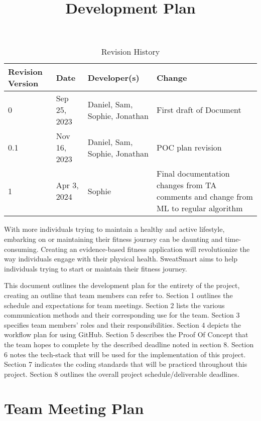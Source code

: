 \documentclass{article}
\title{Development Plan\\\progname}
\author{\authname}  %
\date{}
\begin{document}
	\maketitle
	\begin{table}[hp]
		\centering
		\caption{Revision History} \label{TblRevisionHistory}
		\begin{tabularx}{\textwidth}{lllX}
			\toprule
			\textbf{Revision Version} & \textbf{Date} & \textbf{Developer(s)} & \textbf{Change}\\
			\midrule
			0 & Sep 25, 2023 & Daniel, Sam, Sophie, Jonathan & First draft of Document\\
            0.1 & Nov 16, 2023 & Daniel, Sam, Sophie, Jonathan & POC plan revision\\
            1 & Apr 3, 2024 & Sophie & Final documentation changes from TA comments and change from ML to regular algorithm\\ 
            \bottomrule
		\end{tabularx}
	\end{table}
	\vspace{0.5cm}
	\maketitle

	With more individuals trying to maintain a healthy and active lifestyle, embarking on or maintaining their fitness journey can be daunting and time-consuming. Creating an evidence-based fitness application will revolutionize the way individuals engage with their physical health. SweatSmart aims to help individuals trying to start or maintain their fitness journey.

	This document outlines the development plan for the entirety of the project, creating an outline that team members can refer to. Section 1 outlines the schedule and expectations for team meetings. Section 2 lists the various communication methods and their corresponding use for the team. Section 3 specifies team members’ roles and their responsibilities. Section 4 depicts the workflow plan for using GitHub. Section 5 describes the Proof Of Concept that the team hopes to complete by the described deadline noted in section 8. Section 6 notes the tech-stack that will be used for the implementation of this project. Section 7 indicates the coding standards that will be practiced throughout this project. Section 8 outlines the overall project schedule/deliverable deadlines.


	\section{Team Meeting Plan}
\end{document}
